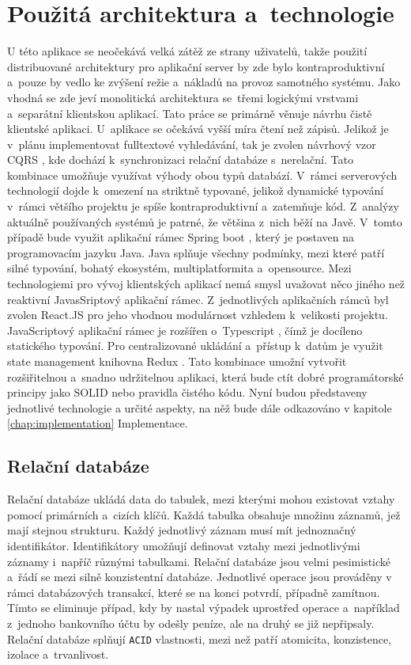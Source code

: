 \newpage
\section{Použitá architektura a~technologie}
U této aplikace se neočekává velká zátěž ze strany uživatelů, takže použití distribuované architektury pro aplikační server by zde bylo kontraproduktivní a~pouze by vedlo ke zvýšení režie a~nákladů na provoz samotného systému. Jako vhodná se zde jeví monolitická architektura se~třemi logickými vrstvami a~separátní klientskou aplikací. Tato práce se primárně věnuje návrhu čistě klientské aplikaci. U~aplikace se očekává vyšší míra čtení než zápisů. Jelikož je v~plánu implementovat fulltextové vyhledávání, tak je zvolen návrhový vzor CQRS \cite{cqrsMicrosoft, cqrsAws}, kde dochází k~synchronizaci relační databáze s~nerelační. Tato kombinace umožňuje využívat výhody obou typů databází. V~rámci serverových technologií dojde k~omezení na striktně typované, jelikož dynamické typování v~rámci většího projektu je spíše kontraproduktivní a~zatemňuje kód. Z~analýzy aktuálně používaných systémů je patrné, že většina z~nich běží na Javě. V~tomto případě bude využit aplikační rámec Spring boot \cite{springBoot}, který je postaven na programovacím jazyku Java. Java splňuje všechny podmínky, mezi které patří silné typování, bohatý ekosystém, multiplatformita a~opensource. Mezi technologiemi pro vývoj klientských aplikací nemá smysl uvažovat něco jiného než reaktivní JavasSriptový aplikační rámec. Z~jednotlivých aplikačních rámců byl zvolen React.JS \cite{reactDev} pro jeho vhodnou modulárnost vzhledem k~velikosti projektu. JavaScriptový aplikační rámec je rozšířen o~Typescript \cite{typescript}, čímž je docíleno statického typování. Pro centralizované ukládání a~přístup k~datům je využit state management knihovna Redux \cite{redux}. Tato kombinace umožní vytvořit rozšiřitelnou a~snadno udržitelnou aplikaci, která bude ctít dobré programátorské principy jako SOLID \cite{solid} nebo pravidla čistého kódu.
\newpara
Nyní budou představeny jednotlivé technologie a určité aspekty, na něž bude dále odkazováno v kapitole \ref{chap:implementation} Implementace.

\subsection{Relační databáze}
Relační databáze \cite{relationalDatabaseIbm, relationalDatabaseOracle} ukládá data do tabulek, mezi kterými mohou existovat vztahy pomocí primárních a~cizích klíčů. Každá tabulka obsahuje množinu záznamů, jež mají stejnou strukturu. Každý jednotlivý záznam musí mít jednoznačný identifikátor. Identifikátory umožňují definovat vztahy mezi jednotlivými záznamy i~napříč různými tabulkami. Relační databáze jsou velmi pesimistické a~řádí se mezi silně konzistentní databáze. Jednotlivé operace jsou prováděny v rámci databázových transakcí, které se na konci potvrdí, případně zamítnou. Tímto se eliminuje případ, kdy by nastal výpadek uprostřed operace a~například z~jednoho bankovního účtu by odešly peníze, ale na druhý se již nepřipsaly. Relační databáze splňují \texttt{ACID} vlastnosti, mezi než patří atomicita, konzistence, izolace a~trvanlivost.

